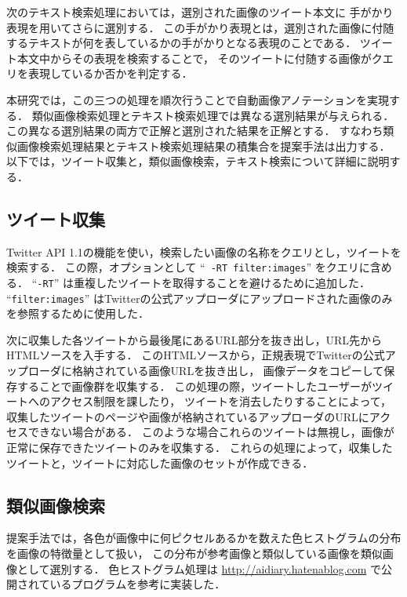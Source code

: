 \documentclass{deimj}
\begin{document}
次のテキスト検索処理においては，選別された画像のツイート本文に
手がかり表現を用いてさらに選別する．
この手がかり表現とは，選別された画像に付随するテキストが何を表しているかの手がかりとなる表現のことである．
ツイート本文中からその表現を検索することで，
そのツイートに付随する画像がクエリを表現しているか否かを判定する．

本研究では，この三つの処理を順次行うことで自動画像アノテーションを実現する．
類似画像検索処理とテキスト検索処理では異なる選別結果が与えられる．
この異なる選別結果の両方で正解と選別された結果を正解とする．
すなわち類似画像検索処理結果とテキスト検索処理結果の積集合を提案手法は出力する．
以下では，ツイート収集と，類似画像検索，テキスト検索について詳細に説明する．

\subsection{ツイート収集}
\label{sec:tweetCollect}
Twitter API 1.1の機能を使い，検索したい画像の名称をクエリとし，ツイートを検索する．
この際，オプションとして
``\verb| -RT filter:images|''
をクエリに含める．
``\verb|-RT|''
は重複したツイートを取得することを避けるために追加した．
``\verb|filter:images|''
はTwitterの公式アップローダにアップロードされた画像のみを参照するために使用した．

次に収集した各ツイートから最後尾にあるURL部分を抜き出し，URL先からHTMLソースを入手する．
このHTMLソースから，正規表現でTwitterの公式アップローダに格納されている画像URLを抜き出し，
画像データをコピーして保存することで画像群を収集する．
この処理の際，ツイートしたユーザーがツイートへのアクセス制限を課したり，
ツイートを消去したりすることによって，
収集したツイートのページや画像が格納されているアップローダのURLにアクセスできない場合がある．
このような場合これらのツイートは無視し，画像が正常に保存できたツイートのみを収集する．
これらの処理によって，収集したツイートと，ツイートに対応した画像のセットが作成できる．


\subsection{類似画像検索}
\label{sec:similar}

提案手法では，各色が画像中に何ピクセルあるかを数えた色ヒストグラムの分布を画像の特徴量として扱い，
この分布が参考画像と類似している画像を類似画像として選別する\cite{Datta08imageretrieval:}．
色ヒストグラム処理は
\url{http://aidiary.hatenablog.com}
で公開されているプログラムを参考に実装した．
\end{document}

